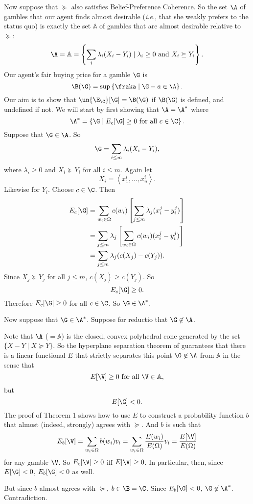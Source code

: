 Now suppose that $\succeq$ also satisfies Belief-Preference Coherence. So the set $\A$ of gambles that our agent finds almost desirable (\textit{i.e.}, that she weakly prefers to the status quo) is exactly the set $\mathbb{A}$ of gambles that are almost desirable relative to $\succeq$:
$$
\A=\mathbb{A}=\left\{\sum_i \lambda_i(X_i-Y_i) \mathrel{|} \lambda_i\geq0 \text{ and } X_i\succeq Y_i\right\}.
$$
Our agent's fair buying price for a gamble $\G$ is 
$$ \B(\G)=\sup\left\{\fraka \mathrel{|} \G-a\in\A\right\}. $$
Our aim is to show that $\un{\E_\C}[\G]=\B(\G)$ if $\B(\G)$ is defined, and undefined if not. We will start by first showing that $\A=\A^*$ where
$$ \A^*=\left\{\G \mathrel{|} E_c[\G]\geq0 \text{ for all } c\in\C\right\}. $$
Suppose that $\G\in\A$. So
$$ \G=\sum_{i\leq m} \lambda_i(X_i-Y_i), $$
where $\lambda_i\geq0$ and $X_i\succeq Y_i$ for all $i\leq m$. 
Again let 
$$ X_i=\left<x^i_1,\hdots,x^i_n\right>. $$
Likewise for $Y_i$. Choose $c\in\C$. Then
$$
\begin{aligned}
E_c[\G] &= \sum_{w_i\in\Omega} c(w_i) \left[\sum_{j\leq m} \lambda_j(x^j_i-y^j_i)\right]\\
        &= \sum_{j\leq m} \lambda_j \left[\sum_{w_i\in\Omega} c(w_i)(x^j_i-y^j_i)\right]\\
				&= \sum_{j\leq m} \lambda_j (c(X_j)-c(Y_j)).
\end{aligned}
$$
Since $X_j\succeq Y_j$ for all $j\leq m$, $c(X_j)\geq c(Y_j)$. So
$$ E_c[\G]\geq0. $$
Therefore $E_c[\G]\geq0$ for all $c\in\C$. So $\G\in\A^*$.

Now suppose that $\G\in\A^*$. Suppose for reductio that $\G\not\in\A$.

Note that $\A$ ($=\mathbb{A}$) is the closed, convex polyhedral cone generated by the set $\{X-Y \mathrel{|} X\succeq Y\}$. So the hyperplane separation theorem of \citet[p. 50]{Kuhn1956} guarantees that there is a linear functional $E$ that strictly separates this point $\G\not\in\A$ from $\mathbb{A}$ in the sense that
$$ E[\V]\geq0 \text{ for all } \V\in\mathbb{A}, $$
but
$$ E[\G]<0. $$
The proof of Theorem 1 shows how to use $E$ to construct a probability function $b$ that almost (indeed, strongly) agrees with $\succeq$. And $b$ is such that 
$$
E_b[\V]=\sum_{w_i\in\Omega} b(w_i)v_i=\sum_{w_i\in\Omega} \frac{E(w_i)}{E(\Omega)}v_i=\frac{E[\V]}{E(\Omega)}
$$
for any gamble $\V$. So $E_c[\V]\geq0$ iff $E[\V]\geq0$. In particular, then, since $E[\G]<0$, $E_b[\G]<0$ as well.

But since $b$ almost agrees with $\succeq$, $b\in\B=\C$. Since $E_b[\G]<0$, $\G\not\in\A^*$. Contradiction.

